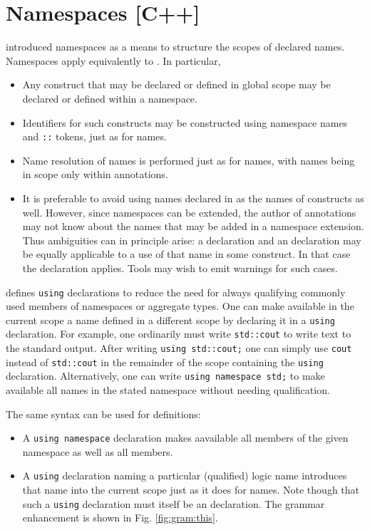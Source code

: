 \section{Namespaces [C++]}
\label{sec:namespaces}

\lang introduced namespaces as a means to structure the scopes of declared names. Namespaces apply equivalently to \NAME. In particular,
\begin{itemize}
\item Any \NAME construct that may be declared or defined 
in global scope may be declared or defined within a namespace.
\item Identifiers for such constructs may be constructed using namespace names and \lstinline|::| tokens, just as for \lang names.
\item Name resolution of \NAME names is performed just as for \lang names, with \NAME names being in scope only within \NAME annotations.
\item It is preferable to avoid using names declared in \lang as the names of \NAME constructs as well. However, since namespaces can be extended, the author of \NAME annotations may not know about the \lang names that may be added in a namespace extension. Thus ambiguities can in
principle arise: a \lang declaration and an \NAME
declaration may be equally applicable to a use of that name 
in some \NAME construct. In that case the \NAME declaration applies.
Tools may wish to emit warnings for such cases.

\end{itemize}

\lang defines \lstinline|using| declarations to reduce the need for always qualifying commonly used members of namespaces or aggregate types.
One can make available in the current scope a name defined in a different scope by declaring it in a \lstinline|using| declaration. For example,
one ordinarily must write \lstinline|std::cout| to write text to the standard output. After writing \lstinline|using std::cout;| one can simply use \lstinline|cout| instead of \lstinline|std::cout| in the remainder of the scope containing the \lstinline|using| declaration.
Alternatively, one can write \lstinline|using namespace std;| to make available all names in the stated namespace without needing qualification.

The same syntax can be used for \NAME definitions:
\begin{itemize}
	\item A \lang \lstinline|using namespace| declaration makes aavailable all \NAME members of the given namespace as well as all \lang members.
	\item A \lstinline|using| declaration naming a particular (qualified) logic name introduces that name into the current scope just as it does for \lang names. Note though that such a \lstinline|using| declaration must itself be an \NAME declaration. The grammar enhancement is shown in Fig. \ref{fig:gram:this}.
\end{itemize}


